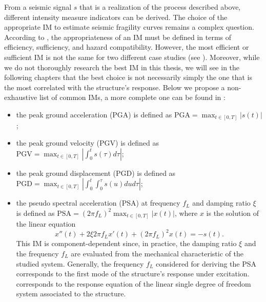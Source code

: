 From a seismic signal $s$ that is a realization of the process described above, different intensity measure  indicators can be derived.
The choice of the appropriate IM to estimate seismic fragility curves
remains a complex question. 
According to \citet{giovenale_comparing_2004}, the appropriateness of an IM must be defined in terms of efficiency, sufficiency, and hazard compatibility.
However, the most efficient or sufficient IM is not the same for two different case studies (see \cite{mackie_probabilistic_2001,hariri-ardebili_probabilistic_2016}). %
Moreover, while we do not  thoroughly research the best IM in this thesis, we will see in the following chapters that the best choice is not necessarily simply the one that is the most correlated with the structure's response.
Below we propose a non-exhaustive list of common IMs, a more complete one can be found in \cite{luco_structure-specific_2007}:
    \begin{itemize}
        \item the peak ground acceleration (PGA) is defined as $\text{PGA}=\max_{t\in[0,T]}|s(t)|$;
        \item the peak ground velocity (PGV) is defined as $\text{PGV}=\max_{t\in[0,T]}\left|\int_0^ts(\tau)d\tau \right|$;
        \item the peak ground displacement (PGD) is defined as $\text{PGD}=\max_{t\in[0,T]}\left|\int_{0}^{t}\int_{0}^{\tau}s(u)dud\tau\right|$;
        \item the pseudo spectral acceleration (PSA) at frequency $f_L$ and damping ratio $\xi$ is defined as $\text{PSA}=(2\pi f_L)^2\max_{t\in[0,T]}|x(t)|$, where $x$ is the solution of the linear equation
        \begin{equation}\label{eq:intro-frag:ALS}
            x''(t) + 2\xi2\pi f_Lx'(t)+(2\pi f_L)^2x(t) = -s(t).
        \end{equation}
        This IM is component-dependent since, in practice, the damping ratio $\xi$ and the frequency $f_L$ are evaluated from the mechanical characteristic of the studied system. Generally, the frequency $f_L$ considered for deriving the PSA corresponds to the first mode of the structure's response under excitation.  corresponds to the response equation of the linear single degree of freedom system associated to the structure.
    \end{itemize}


